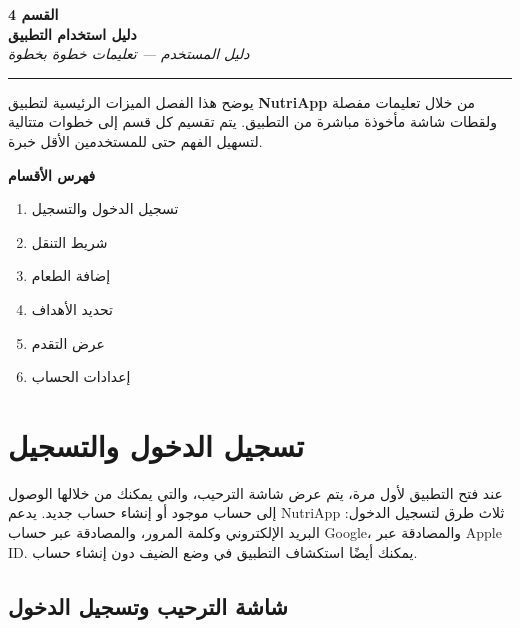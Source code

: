 \documentclass[a4paper,12pt]{article}
\begin{document}
\begin{center}
  {\Huge\bfseries\color{nutrigreen} القسم 4}\\[6pt]
  {\Large\bfseries\color{nutridark} دليل استخدام التطبيق}\\[4pt]
  {\normalsize\itshape\color{nutrigray} دليل المستخدم --- تعليمات خطوة بخطوة}
\end{center}

\medskip
\noindent\rule{\textwidth}{1.5pt}{\color{nutrigreen}}
\medskip

\noindent يوضح هذا الفصل الميزات الرئيسية لتطبيق \textbf{NutriApp}
من خلال تعليمات مفصلة ولقطات شاشة مأخوذة مباشرة من التطبيق.
يتم تقسيم كل قسم إلى خطوات متتالية لتسهيل الفهم حتى
للمستخدمين الأقل خبرة.

\medskip
\begin{infobox}
  \textbf{\color{nutrigreen}فهرس الأقسام}
  \begin{enumerate}[leftmargin=1.4em, itemsep=2pt]
    \item تسجيل الدخول والتسجيل
    \item شريط التنقل
    \item إضافة الطعام
    \item تحديد الأهداف
    \item عرض التقدم
    \item إعدادات الحساب
  \end{enumerate}
\end{infobox}

\newpage

\section{تسجيل الدخول والتسجيل}

عند فتح التطبيق لأول مرة، يتم عرض شاشة الترحيب،
والتي يمكنك من خلالها الوصول إلى حساب موجود أو إنشاء حساب جديد.
يدعم NutriApp ثلاث طرق لتسجيل الدخول: البريد الإلكتروني وكلمة المرور،
والمصادقة عبر حساب Google، والمصادقة عبر Apple ID.
يمكنك أيضًا استكشاف التطبيق في وضع الضيف دون إنشاء حساب.

\subsection{شاشة الترحيب وتسجيل الدخول}
\end{document}
